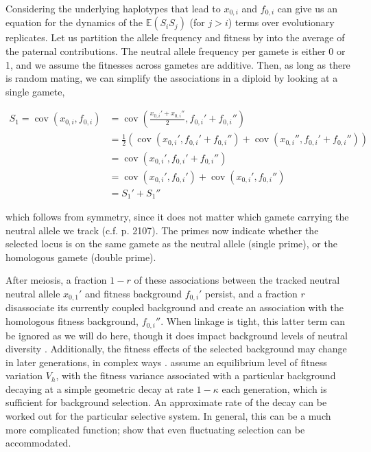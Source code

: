 \documentclass[11pt]{article}
\newcommand{\E}{\mathbb{E}}
\DeclareMathOperator{\cov}{cov}
\begin{document}
Considering the underlying haplotypes that lead to $x_{0,i}$ and $f_{0,i}$ can
give us an equation for the dynamics of the $\E(S_i S_j)$ (for $j > i$) terms
over evolutionary replicates. Let us partition the allele frequency and fitness
by into the average of the paternal contributions. The neutral allele frequency
per gamete is either 0 or 1, and we assume the fitnesses across gametes are
additive. Then, as long as there is random mating, we can simplify the
associations in a diploid by looking at a single gamete,

\begin{align}
  S_1 = \cov(x_{0,i}, f_{0,i}) &= \cov\left(\frac{x_{0,i}' + x_{0,i}''}{2}, f_{0,i}' + f_{0,i}''\right)  \\
                               &= \frac{1}{2}\left(\cov(x_{0,i}', f_{0,i}' + f_{0,i}'') + \cov(x_{0,i}'', f_{0,i}' + f_{0,i}'')\right)  \\
                               &= \cov(x_{0,i}', f_{0,i}' + f_{0,i}'')  \\
                               &= \cov(x_{0,i}', f_{0,i}') + \cov(x_{0,i}', f_{0,i}'')  \\
                               &= S_1' + S_1''
\end{align}

which follows from symmetry, since it does not matter which gamete carrying the
neutral allele we track (c.f. \cite{Santiago1998-bs} p. 2107). The primes now
indicate whether the selected locus is on the same gamete as the neutral
allele (single prime), or the homologous gamete (double prime).

After meiosis, a fraction $1-r$ of these associations between the tracked
neutral neutral allele $x_{0,1}'$ and fitness background $f_{0,i}'$ persist,
and a fraction $r$ disassociate its currently coupled background and create an
association with the homologous fitness background, $f_{0,i}''$. When linkage
is tight, this latter term can be ignored as we will do here, though it does
impact background levels of neutral diversity \parencite{Santiago1995-hx}.
Additionally, the fitness effects of the selected background may change in
later generations, in complex ways \parencite{Barton1986-yh,Turelli1990-kd}.
\textcite{Santiago1995-hx} assume an equilibrium level of fitness variation
$V_h$, with the fitness variance associated with a particular background
decaying at a simple geometric decay at rate $1-\kappa$ each generation, which
is sufficient for background selection. An approximate rate of the decay can be
worked out for the particular selective system. In general, this can be a much
more complicated function; \textcite{Buffalo2019-qs} show that even fluctuating
selection can be accommodated.
\end{document}
